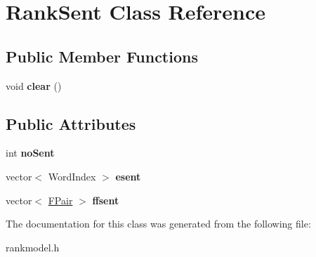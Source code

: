 \hypertarget{classRankSent}{\section{\-Rank\-Sent \-Class \-Reference}
\label{classRankSent}
}
\subsection*{\-Public \-Member \-Functions}
\begin{DoxyCompactItemize}
\item 
\hypertarget{classRankSent_ad471386c37c87140b695508344ab3ed5}{void {\bfseries clear} ()}\label{classRankSent_ad471386c37c87140b695508344ab3ed5}

\end{DoxyCompactItemize}
\subsection*{\-Public \-Attributes}
\begin{DoxyCompactItemize}
\item 
\hypertarget{classRankSent_abbff37eff372863395072a19d87d0103}{int {\bfseries no\-Sent}}\label{classRankSent_abbff37eff372863395072a19d87d0103}

\item 
\hypertarget{classRankSent_a07f2cf36f5a76f5b79b555d1dfdf57e2}{vector$<$ \-Word\-Index $>$ {\bfseries esent}}\label{classRankSent_a07f2cf36f5a76f5b79b555d1dfdf57e2}

\item 
\hypertarget{classRankSent_a961164a2d6f19c252b2ecd34e3a99b02}{vector$<$ \hyperlink{classFPair}{\-F\-Pair} $>$ {\bfseries ffsent}}\label{classRankSent_a961164a2d6f19c252b2ecd34e3a99b02}

\end{DoxyCompactItemize}


\-The documentation for this class was generated from the following file\-:\begin{DoxyCompactItemize}
\item 
rankmodel.\-h\end{DoxyCompactItemize}

